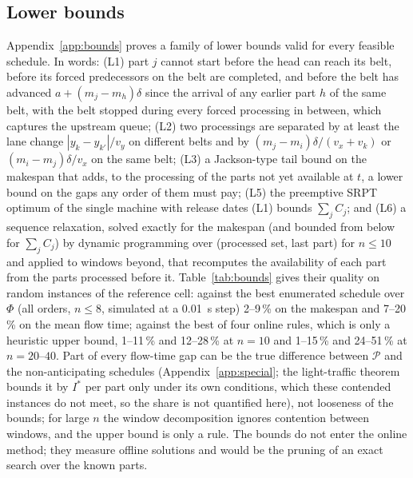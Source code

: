 \documentclass[11pt,a4paper]{article}
\theoremstyle{plain}
\theoremstyle{definition}
\theoremstyle{remark}
\newcommand{\Pb}{\mathcal{P}}
\begin{document}
\subsection{Lower bounds}\label{sec:bounds}
Appendix~\ref{app:bounds} proves a family of lower bounds valid for every feasible
schedule. In words: (L1) part $j$ cannot start before the head can reach its belt, before
its forced predecessors on the belt are completed, and before the belt has advanced
$a+(m_j-m_h)\delta$ since the arrival of any earlier part $h$ of the same belt, with the
belt stopped during every forced processing in between, which captures the upstream
queue; (L2) two processings are separated by at least the lane change $|y_k-y_{k'}|/v_y$
on different belts and by $(m_j-m_i)\delta/(v_x+v_k)$ or $(m_i-m_j)\delta/v_x$ on the same
belt; (L3) a Jackson-type tail bound on the makespan that adds, to the processing of the
parts not yet available at $t$, a lower bound on the gaps any order of them must pay;
(L5) the preemptive SRPT optimum \cite{Schrage1968,Baker1974} of the single machine with
release dates (L1) bounds $\sum_jC_j$; and (L6) a sequence relaxation, solved exactly for
the makespan (and bounded from below for $\sum_jC_j$) by dynamic
programming over (processed set, last part) for $n\le10$ and applied to windows beyond,
that recomputes the availability of each part from the parts processed before it.
Table~\ref{tab:bounds} gives their quality on random instances of the reference cell:
against the best enumerated schedule over $\Phi$ (all orders, $n\le8$, simulated at a
0.01~s step) 2--9\,\% on the
makespan and 7--20\,\% on the mean flow time; against the best of four online rules,
which is only a heuristic upper bound, 1--11\,\% and 12--28\,\% at $n=10$ and
1--15\,\% and 24--51\,\% at $n=20$--$40$. Part of every
flow-time gap can be the true difference between $\Pb$ and the non-anticipating
schedules (Appendix~\ref{app:special}; the light-traffic theorem bounds it by $I^\ast$
per part only under its own conditions, which these contended instances do not meet, so
the share is not quantified here), not looseness of the bounds; for
large $n$ the window decomposition ignores contention between windows, and the upper
bound is only a rule. The bounds do not enter the online method; they measure offline
solutions and would be the pruning of an exact search over the known parts.
\end{document}
